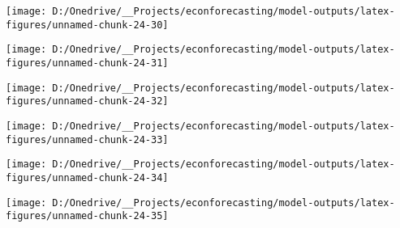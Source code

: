 \documentclass[11pt, letterpaper]{article}\usepackage[]{graphicx}\usepackage[]{color}
\begin{document}
{\centering \texttt{[image: D:/Onedrive/\_\_Projects/econforecasting/model-outputs/latex-figures/unnamed-chunk-24-30]} 

}




{\centering \texttt{[image: D:/Onedrive/\_\_Projects/econforecasting/model-outputs/latex-figures/unnamed-chunk-24-31]} 

}




{\centering \texttt{[image: D:/Onedrive/\_\_Projects/econforecasting/model-outputs/latex-figures/unnamed-chunk-24-32]} 

}




{\centering \texttt{[image: D:/Onedrive/\_\_Projects/econforecasting/model-outputs/latex-figures/unnamed-chunk-24-33]} 

}




{\centering \texttt{[image: D:/Onedrive/\_\_Projects/econforecasting/model-outputs/latex-figures/unnamed-chunk-24-34]} 

}




{\centering \texttt{[image: D:/Onedrive/\_\_Projects/econforecasting/model-outputs/latex-figures/unnamed-chunk-24-35]} 

}
\end{document}
